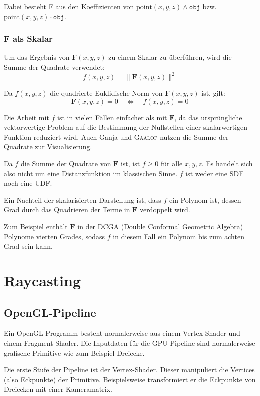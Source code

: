\documentclass[
	ngerman,%
	accentcolor=9c,%
	ruledheaders=section,%
	class=report,%
	thesis={type=bachelor},%
	fontsize=11pt,%
	parskip=half-,%
	custommargins=true,%
	marginpar=false,%
]{tudapub}
\begin{document}
Dabei besteht F aus den Koeffizienten von \(
\text{point}(x,y,z) \wedge \texttt{obj}
\)
bzw.
\(
\text{point}(x,y,z) \cdot \texttt{obj}
\).






\subsubsection{F als Skalar}
Um das Ergebnis von \( \mathbf{F}(x,y,z) \) zu einem Skalar zu überführen, wird die Summe der Quadrate verwendet:
\[
f(x,y,z) = \|\mathbf{F}(x,y,z)\|^2
\]

Da \( f(x,y,z) \) die quadrierte Euklidische Norm von \( \mathbf{F}(x,y,z) \) ist, gilt:
\[
\mathbf{F}(x,y,z) = 0 \quad \Leftrightarrow \quad f(x,y,z) = 0
\]

Die Arbeit mit \( f \) ist in vielen Fällen einfacher als mit \( \mathbf{F} \), da das ursprüngliche vektorwertige Problem auf die Bestimmung der Nullstellen einer skalarwertigen Funktion reduziert wird. Auch Ganja und \textsc{Gaalop} nutzen die Summe der Quadrate zur Visualisierung.


Da $f$ die Summe der Quadrate von \( \mathbf{F} \) ist, ist $f \geq 0$ für alle $x,y,z$. Es handelt sich also nicht um eine Distanzfunktion im klassischen Sinne. $f$ ist weder eine SDF noch eine UDF. 

Ein Nachteil der skalarisierten Darstellung ist, dass \( f \) ein Polynom ist, dessen Grad durch das Quadrieren der Terme in \( \mathbf{F} \) verdoppelt wird. 

Zum Beispiel enthält \( \mathbf{F} \) in der DCGA (Double Conformal Geometric Algebra) Polynome vierten Grades, sodass \( f \) in diesem Fall ein Polynom bis zum achten Grad sein kann.

\section{Raycasting}
\subsection{OpenGL-Pipeline}

Ein OpenGL-Programm besteht normalerweise aus einem Vertex-Shader und einem Fragment-Shader.
Die Inputdaten für die GPU-Pipeline sind normalerweise grafische Primitive wie zum Beispiel Dreiecke. 

Die erste Stufe der Pipeline ist der Vertex-Shader. Dieser manipuliert die Vertices (also Eckpunkte) der Primitive. Beispielsweise transformiert er die Eckpunkte von Dreiecken mit einer Kameramatrix. 
\end{document}
